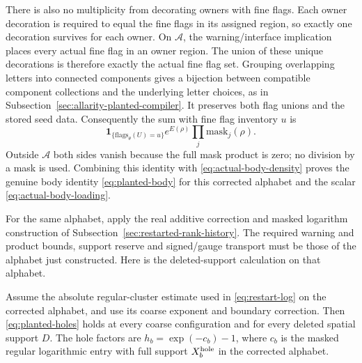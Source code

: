 There is also no multiplicity from decorating owners with fine
flags. Each owner decoration is required to equal the fine flags
in its assigned region, so exactly one decoration survives for
each owner. On $\mathcal A$, the warning/interface implication places
every actual fine flag in an owner region. The union of these
unique decorations is therefore exactly the actual fine flag set.
Grouping overlapping letters into connected components gives a
bijection between compatible component collections and the
underlying letter choices, as in
Subsection~\ref{sec:allarity-planted-compiler}. It preserves both
flag unions and the stored seed data. Consequently the sum with
fine flag inventory $u$ is
\[
 \mathbf1_{\{\mathrm{flags}_\theta(U)=u\}}
       e^{E(\rho)}\prod_j\mathrm{mask}_j(\rho).
\]
Outside $\mathcal A$ both sides vanish because the full mask
product is zero; no division by a mask is used. Combining this
identity with \eqref{eq:actual-body-density} proves the genuine
body identity \eqref{eq:planted-body} for this corrected alphabet
and the scalar \eqref{eq:actual-body-loading}.

For the same alphabet, apply the real additive correction and
masked logarithm construction of
Subsection~\ref{sec:restarted-rank-history}. The required warning
and product bounds, support reserve and signed/gauge transport
must be those of the alphabet just constructed. Here is the
deleted-support calculation on that alphabet.

\begin{proposition}
\label{prop:corrected-regular-deletion}
Assume the absolute regular-cluster estimate used in
\eqref{eq:restart-log} on the corrected alphabet, and use its
coarse exponent and boundary correction. Then
\eqref{eq:planted-holes} holds at every coarse configuration and
for every deleted spatial support $D$. The hole factors are
$h_b=\exp(-c_b)-1$, where $c_b$ is the masked regular logarithmic
entry with full support $X_b^{\rm hole}$ in the corrected alphabet.
\end{proposition}

